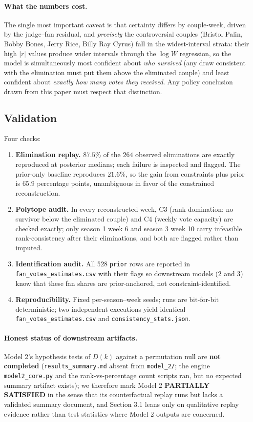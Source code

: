 \documentclass[11pt]{article}
\begin{document}
\paragraph{What the numbers cost.} The single most important caveat is that certainty
differs by couple-week, driven by the judge--fan residual, and \emph{precisely} the
controversial couples (Bristol Palin, Bobby Bones, Jerry Rice, Billy Ray Cyrus) fall in
the widest-interval strata: their high $|r|$ values produce wider intervals through the
$\log W$ regression, so the model is simultaneously most confident about \emph{who
survived} (any draw consistent with the elimination must put them above the eliminated
couple) and least confident about \emph{exactly how many votes they received}. Any policy
conclusion drawn from this paper must respect that distinction.

\subsection{Validation}

Four checks:
\begin{enumerate}
\item \textbf{Elimination replay.} $87.5\%$ of the $264$ observed eliminations are exactly
reproduced at posterior medians; each failure is inspected and flagged. The prior-only
baseline reproduces $21.6\%$, so the gain from constraints plus prior is $65.9$
percentage points, unambiguous in favor of the constrained reconstruction.
\item \textbf{Polytope audit.} In every reconstructed week, C3 (rank-domination: no
survivor below the eliminated couple) and C4 (weekly vote capacity) are checked exactly;
only season 1 week 6 and season 3 week 10 carry infeasible rank-consistency after their
eliminations, and both are flagged rather than imputed.
\item \textbf{Identification audit.} All 528 \texttt{prior} rows are reported in
\texttt{fan\_votes\_estimates.csv} with their flags so downstream models (2 and 3) know
that these fan shares are prior-anchored, not constraint-identified.
\item \textbf{Reproducibility.} Fixed per-season--week seeds; runs are bit-for-bit
deterministic; two independent executions yield identical
\texttt{fan\_votes\_estimates.csv} and \texttt{consistency\_stats.json}.
\end{enumerate}

\paragraph{Honest status of downstream artifacts.} Model 2's hypothesis tests of $D(k)$
against a permutation null are \textbf{not completed} (\texttt{results\_summary.md} absent
from \texttt{model\_2/}; the engine \texttt{model2\_core.py} and the rank-vs-percentage
count scripts ran, but no expected summary artifact exists); we therefore mark Model 2
\textbf{PARTIALLY SATISFIED} in the sense that its counterfactual replay runs but lacks a
validated summary document, and Section 3.1 leans only on qualitative replay evidence
rather than test statistics where Model 2 outputs are concerned.
\end{document}
